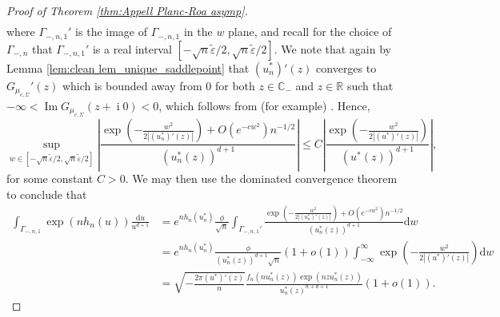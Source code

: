 \documentclass[reqno]{amsart}
\newcommand{\1}{\mathbf{1}}
\newcommand{\dd}{\mathrm{d}}
\DeclareMathOperator{\ii}{i}
\newcommand{\C}{\mathbb{C}}
\renewcommand\Im{\operatorname{Im}}
\newcommand{\eps}{\varepsilon}
\newcommand{\R}{\mathbb{R}}
\def\R{\mathbb{R}}
\theoremstyle{plain}
\theoremstyle{definition}
\theoremstyle{remark}
\numberwithin{equation}{section}
\begin{document}
\begin{proof}[Proof of Theorem \ref{thm:Appell Planc-Roa asymp}]
\begin{equation}
\begin{aligned}
		\end{aligned}
		\end{equation}where $\Gamma_{-,n,1}'$ is the image of $\Gamma_{-,n,1}$ in the $w$ plane, and recall for the choice of $\Gamma_{-,n}$ that $\Gamma_{-,n,1}'$ is a real interval $[-\sqrt{n}\tilde\eps/2,\sqrt{n}\tilde{\eps}/2]$. We note that again by Lemma  \ref{lem:clean lem_unique_saddlepoint} that $(u_n^*)'(z)$ converges to $G_{\mu_{c,\Sigma}}'(z)$ which is bounded away from $0$ for both $z\in\C_{-}$ and $z\in\R$ such that $-\infty<\Im G_{\mu_{c,\Sigma}}(z+\ii0)<0$, which follows from (for example) \cite[Lemma 2.6]{Bercovici-Wang-Zhong2018}. Hence, \begin{equation*}
		\sup_{w\in[-\sqrt{n}\tilde{\eps}/2,\sqrt{n}\tilde{\eps}/2]}\left|\frac{\exp\left(-\frac{w^2}{2|(u_n^*)'\left(z\right)|}  \right)+O(e^{-cw^2})n^{-1/2}}{\left(u_n^*(z)\right)^{d+1}}  \right|\leq C\left| \frac{\exp\left(-\frac{w^2}{2|(u^*)'(z)|} \right)}{(u^*(z))^{d+1}}\right|,
		\end{equation*} for some constant $C>0$. We may then use the dominated convergence theorem to conclude that \begin{equation}\label{eq:main contour contribution}
	\begin{aligned}
			\int_{\Gamma_{-,n,1}}\exp(nh_{n}(u))\frac{\dd u}{u^{d+1}}&=e^{nh_{n}(u_n^*)}\frac{\phi}{\sqrt{n}}\int_{\Gamma_{-,n,1}'}\frac{\exp\left(-\frac{w^2}{2|(u_n^*)'\left(z\right)|} \right)+O(e^{-cw^2})n^{-1/2}}{\left(u_n^*(z)\right)^{d+1}} \dd w\\
			&=e^{nh_{n}(u_n^*)}\frac{\phi}{(u_n^*(z))^{d+1}\sqrt{n}}(1+o(1))\int_{-\infty}^{\infty}\exp\left(-\frac{w^2}{2|(u^*)'(z)|} \right)\dd w \\
			&=\sqrt{-\frac{2\pi (u^*)'(z)}{n}}\frac{f_{n}\left(nu_n^*(z) \right)\exp\left(nzu_n^*(z) \right)}{u_n^*(z)^{n+d+1}}(1+o(1)).
	\end{aligned}
		\end{equation} 
		\smallskip
		

\end{proof}
\end{document}
